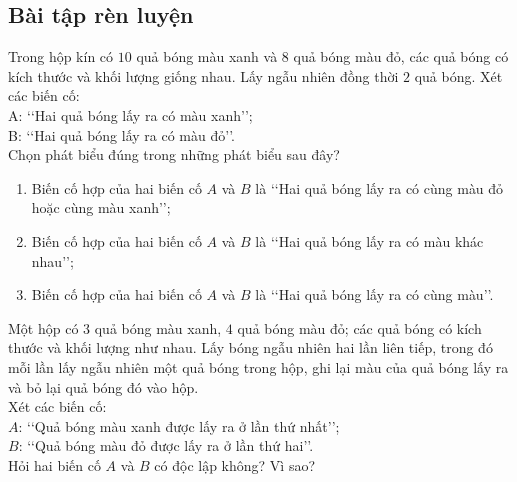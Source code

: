 \subsection{Bài tập rèn luyện}
\begin{bt}%
	Trong hộp kín có $10$ quả bóng màu xanh và $8$ quả bóng màu đỏ, các quả bóng có kích thước và khối lượng giống nhau. Lấy ngẫu nhiên đồng thời $2$ quả bóng. Xét các biến cố:\\
	A: \lq\lq Hai quả bóng lấy ra có màu xanh\rq\rq;\\
	B: \lq\lq Hai quả bóng lấy ra có màu đỏ\rq\rq.\\
	Chọn phát biểu đúng trong những phát biểu sau đây?
	\begin{enumerate}
	\item Biến cố hợp của hai biến cố $A$ và $B$ là \lq\lq Hai quả bóng lấy ra có cùng màu đỏ hoặc cùng màu xanh\rq\rq;
	\item Biến cố hợp của hai biến cố $A$ và $B$ là \lq\lq Hai quả bóng lấy ra có màu khác nhau\rq\rq;
	\item Biến cố hợp của hai biến cố $A$ và $B$ là \lq\lq Hai quả bóng lấy ra có cùng màu\rq\rq.
	\end{enumerate}
\end{bt}
\begin{bt}%
	Một hộp có $3$ quả bóng màu xanh, $4$ quả bóng màu đỏ; các quả bóng có kích thước và khối lượng như nhau. Lấy bóng ngẫu nhiên hai lần liên tiếp, trong đó mỗi lần lấy ngẫu nhiên một quả bóng trong hộp, ghi lại màu của quả bóng lấy ra và bỏ lại quả bóng đó vào hộp.\\
	Xét các biến cố:\\
	$A$: \lq\lq Quả bóng màu xanh được lấy ra ở lần thứ nhất\rq\rq;\\
	$B$: \lq\lq Quả bóng màu đỏ được lấy ra ở lần thứ hai\rq\rq.\\
	Hỏi hai biến cố $A$ và $B$ có độc lập không? Vì sao?
\end{bt}
